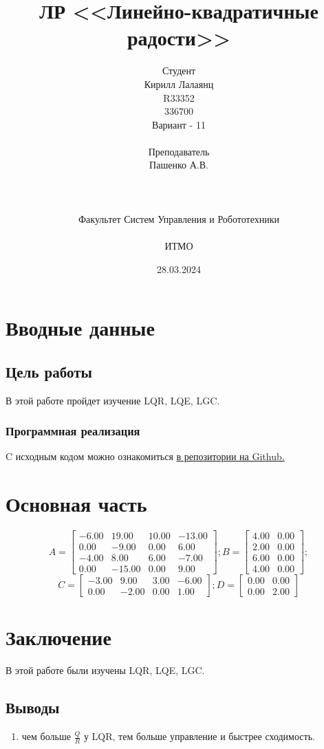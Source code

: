 \documentclass[16pt]{article}
\title{ЛР \textnumero 10 <<Линейно-квадратичные радости>>}
\author{
Студент \\
Кирилл Лалаянц\\
R33352\\
336700\\
Вариант - 11\\
\\
Преподаватель\\
Пашенко А.В. \\
\\
\\
\\
Факультет Систем Управления и Робототехники\\
\\
ИТМО\\
}
\date{28.03.2024}
\begin{document}
\maketitle
\newpage
\tableofcontents
\thispagestyle{empty}

\newpage
\setcounter{page}{1}
\section{Вводные данные}
\subsection{Цель работы}
В этой работе пройдет изучение LQR, LQE, LGC.

\subsubsection{Программная реализация}
C исходным кодом можно ознакомиться \href{https://github.com/lalayants/control-theory-itmo-2023-2024}{в репозитории на Github.}


\newpage
\section{Основная часть}
\[
   A = \begin{bmatrix}
   -6.00 &  19.00 &  10.00 & -13.00\\
    0.00 & -9.00 &  0.00 &  6.00\\
   -4.00 &  8.00 &  6.00 & -7.00\\
    0.00 & -15.00 &  0.00 &  9.00
  \end{bmatrix};
  B = \begin{bmatrix}
   4.00 &  0.00\\
   2.00 &  0.00\\
   6.00 &  0.00\\
   4.00 &  0.00
 \end{bmatrix};
\]
\[
 C = \begin{bmatrix}
   -3.00 &  9.00 &  3.00 & -6.00\\
    0.00 & -2.00 &  0.00 &  1.00
  \end{bmatrix};
  D = \begin{bmatrix}
   0.00 &  0.00\\
   0.00 &  2.00
 \end{bmatrix}
\]

\FloatBarrier


\FloatBarrier


\FloatBarrier

% 

\newpage
\section{Заключение}
В этой работе были изучены LQR, LQE, LGC.
\subsection{Выводы}
\begin{enumerate}
   \item чем больше \(\frac{Q}{R}\) у LQR, тем больше управление и быстрее сходимость.
\end{enumerate}
\end{document}

